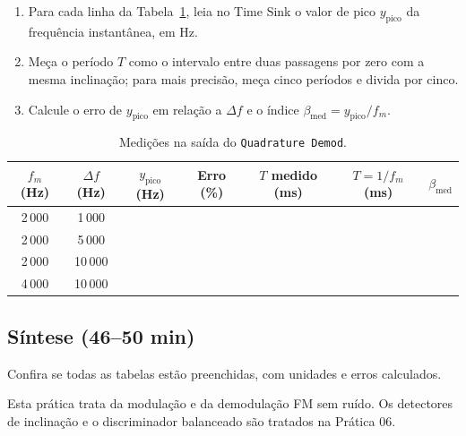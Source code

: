 \documentclass[11pt,a4paper]{article}
\begin{document}
\begin{instrucao}
  \begin{enumerate}[label=\arabic*.]
    \item Para cada linha da Tabela~\ref{tab:disc}, leia no Time Sink o valor de
          pico $y_{\text{pico}}$ da frequência instantânea, em Hz.
    \item Meça o período $T$ como o intervalo entre duas passagens por zero
          com a mesma inclinação; para mais precisão, meça cinco períodos e divida
          por cinco.
    \item Calcule o erro de $y_{\text{pico}}$ em relação a $\Delta f$ e o índice
          $\beta_{\text{med}} = y_{\text{pico}}/f_m$.
  \end{enumerate}
\end{instrucao}

\begin{table}[H]
  \centering
  \begin{tabular}{c c c c c c c}
    \toprule
    $f_m$ (Hz)      & $\Delta f$ (Hz)  & $y_{\text{pico}}$ (Hz) & Erro (\%) &
    $T$ medido (ms) & $T = 1/f_m$ (ms) & $\beta_{\text{med}}$                        \\
    \midrule
    2\,000          & 1\,000           &                        &           &   &  & \\
    2\,000          & 5\,000           &                        &           &   &  & \\
    2\,000          & 10\,000          &                        &           &   &  & \\
    4\,000          & 10\,000          &                        &           &   &  & \\
    \bottomrule
  \end{tabular}
  \caption{Medições na saída do \texttt{Quadrature Demod}.}
  \label{tab:disc}
\end{table}

\subsection*{Síntese (46--50 min)}

Confira se todas as tabelas estão preenchidas, com unidades e erros calculados.

\begin{atencao}
  Esta prática trata da modulação e da demodulação FM sem ruído. Os detectores de
  inclinação e o discriminador balanceado são tratados na Prática 06.
\end{atencao}
\end{document}
